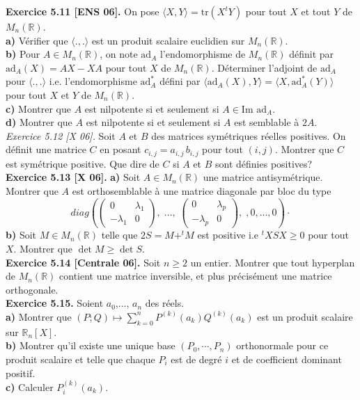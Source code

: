 \documentclass[a4paper,12pt,francais]{article}
\newcommand{\field}[1]{\mathbb{#1}}
\newcommand{\R}{\field{R}}
\newcommand{\im}{\mbox{Im}}
\newcommand{\tr}{\mbox{tr}}
\begin{document}
\noindent
{\bf Exercice 5.11 [ENS 06].} On pose $\langle X,Y \rangle=\tr (X ^tY)$ pour tout $X$ et tout $Y$ de $M_n(\R)$.\\
\indent
{\bf a)} Vérifier que $\langle .,. \rangle$ est un produit scalaire euclidien sur $M_n(\R)$.\\
\indent
{\bf b)} Pour $A \in M_n(\R)$, on note $\mbox{ad}_A$ l'endomorphisme de $M_n(\R)$ définit par $\mbox{ad}_A(X)= AX-XA$ pour tout $X$ de $M_n(\R)$. Déterminer l'adjoint de $\mbox{ad}_A$ pour $\langle.,.\rangle$ i.e. l'endomorphisme $\mbox{ad}^*_A$ défini par
$\langle \mbox{ad}_A(X),Y \rangle= \langle X , \mbox{ad}^*_A(Y) \rangle$ pour tout $X$ et $Y$ de $M_n(\R)$.\\
\indent
{\bf c)} Montrer que $A$ est nilpotente si et seulement si $A \in \im \mbox{ ad}_A$.\\ 
\indent
{\bf d)} Montrer que $A$ est nilpotente si et seulement si $A$ est semblable à $2A$.\\

\noindent
{\it Exercice 5.12 [X 06].} Soit $A$ et $B$ des matrices symétriques réelles positives. On définit une matrice $C$ en posant $c_{i,j}=a_{i,j}\, b_{i,j}$ pour tout $(i,j)$. Montrer que $C$ est symétrique positive. Que dire de $C$ si $A$ et $B$ sont définies positives?\\

\noindent
{\bf Exercice 5.13 [X 06].} {\bf a)} Soit $A \in M_n(\R)$ une matrice antisymétrique. Montrer que $A$ est orthosemblable à une matrice diagonale par bloc du type 
$$ diag \left( 
\left( \begin{array}{cc}
0&\lambda_1\\
-\lambda_1&0
\end{array}
\right), \; \dots, \;
\left( \begin{array}{cc}
0&\lambda_p\\
-\lambda_p&0
\end{array}
\right), \; 
,0, \dots,0\right) \cdot$$
{\bf b)} Soit $M\in M_n(\R)$ telle que $2S=M+^tM$ est positive  i.e $^tXSX \geqslant 0$ pour tout $X$. Montrer que $\det M \geqslant \det S$.\\

\noindent
{\bf Exercice 5.14 [Centrale 06].} Soit $n \geqslant 2$ un entier. Montrer que tout hyperplan de $M_n(\R)$ contient une matrice inversible, et plus précisément une matrice orthogonale.\\

\noindent
{\bf Exercice 5.15.} Soient $a_0$,..., $a_n$ des réels.\\
{\bf a)} Montrer que $\displaystyle (P;Q) \mapsto \sum_{k=0}^n P^{(k)}(a_k) Q^{(k)}(a_k)$ est un produit scalaire sur $\R_n[X]$.\\
{\bf b)} Montrer qu'il existe une unique base $(P_0, \cdots,P_n)$ orthonormale pour ce produit scalaire et telle que chaque $P_i$ est de degré $i$ et de coefficient dominant positif.\\
{\bf c)} Calculer $P_i^{(k)}(a_k)$.\\
\end{document}

